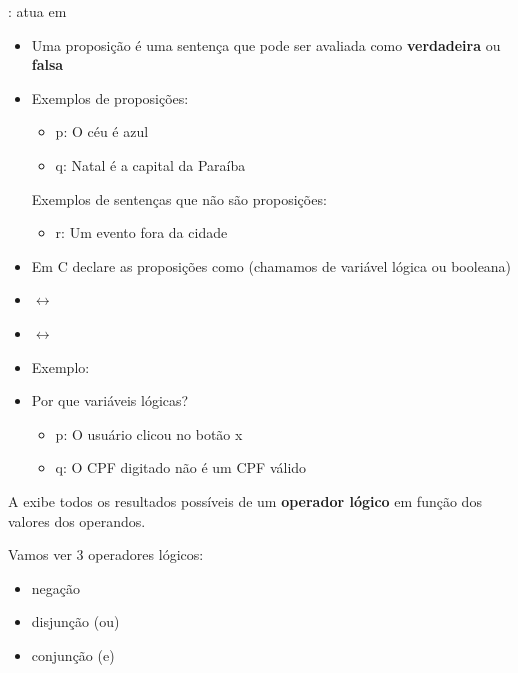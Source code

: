 \documentclass[portuguese,10pt,xcolor=table]{beamer}
\begin{document}
    
    \begin{frame}
		: atua em 
    	\begin{itemize}
    		\item Uma proposição é uma sentença que pode ser avaliada como \textbf{verdadeira} ou \textbf{falsa}
    		\item Exemplos de proposições:
    			\begin{itemize}
    				\item p: O céu é azul
    				\item q: Natal é a capital da Paraíba
    			\end{itemize}
    			Exemplos de sentenças que não são proposições:
    			\begin{itemize}
    				\item r: Um evento fora da cidade
    			\end{itemize}
    	\end{itemize}
	\end{frame}

   \begin{frame}
	   \begin{itemize}
		   \item Em C declare as proposições como  (chamamos de variável lógica ou booleana)
		   \item {} $\leftrightarrow$ 
		   \item {} $\leftrightarrow$ 
		   \item Exemplo:
			   
		   \item Por que variáveis lógicas?
			   \begin{itemize}
				   \item p: O usuário clicou no botão x
				   \item q: O CPF digitado não é um CPF válido
			   \end{itemize}
	   \end{itemize}

   \end{frame}


	\begin{frame}

		A  exibe todos os resultados possíveis de um \textbf{operador lógico} em função dos valores dos operandos.
 
		\vspace{0.5cm}
		Vamos ver 3 operadores lógicos:
		\begin{itemize}
			\item negação
			\item disjunção (ou)
			\item conjunção (e)
		\end{itemize}
    \end{frame}
    
\end{document}
